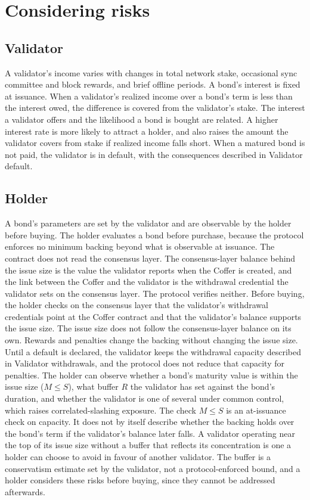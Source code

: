 \documentclass{article}
\begin{document}
\section{Considering risks}

\subsection{Validator}
A validator's income varies with changes in total network stake, occasional sync committee and block rewards, and brief offline periods. A bond's interest is fixed at issuance. When a validator's realized income over a bond's term is less than the interest owed, the difference is covered from the validator's stake. The interest a validator offers and the likelihood a bond is bought are related. A higher interest rate is more likely to attract a holder, and also raises the amount the validator covers from stake if realized income falls short. When a matured bond is not paid, the validator is in default, with the consequences described in Validator default.

\subsection{Holder}
A bond's parameters are set by the validator and are observable by the holder before buying. The holder evaluates a bond before purchase, because the protocol enforces no minimum backing beyond what is observable at issuance. The contract does not read the consensus layer. The consensus-layer balance behind the issue size is the value the validator reports when the Coffer is created, and the link between the Coffer and the validator is the withdrawal credential the validator sets on the consensus layer. The protocol verifies neither. Before buying, the holder checks on the consensus layer that the validator's withdrawal credentials point at the Coffer contract and that the validator's balance supports the issue size. The issue size does not follow the consensus-layer balance on its own. Rewards and penalties change the backing without changing the issue size. Until a default is declared, the validator keeps the withdrawal capacity described in Validator withdrawals, and the protocol does not reduce that capacity for penalties. The holder can observe whether a bond's maturity value is within the issue size (\(M \leq S\)), what buffer \(R\) the validator has set against the bond's duration, and whether the validator is one of several under common control, which raises correlated-slashing exposure. The check \(M \leq S\) is an at-issuance check on capacity. It does not by itself describe whether the backing holds over the bond's term if the validator's balance later falls. A validator operating near the top of its issue size without a buffer that reflects its concentration is one a holder can choose to avoid in favour of another validator. The buffer is a conservatism estimate set by the validator, not a protocol-enforced bound, and a holder considers these risks before buying, since they cannot be addressed afterwards.
\end{document}
